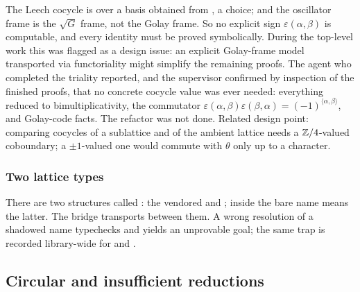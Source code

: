The Leech cocycle is  over a basis obtained from ,
a choice; and the oscillator frame is the $\sqrt G$ frame, not the Golay frame. So no explicit sign
$\varepsilon(\alpha,\beta)$ is computable, and every identity must be proved symbolically. During the
top-level work this was flagged as a design issue: an explicit Golay-frame model transported via
functoriality might simplify the remaining proofs. The agent who completed the triality reported,
and the supervisor confirmed by inspection of the finished proofs, that no concrete cocycle value
was ever needed: everything reduced to bimultiplicativity, the commutator
$\varepsilon(\alpha,\beta)\varepsilon(\beta,\alpha)=(-1)^{\langle\alpha,\beta\rangle}$, and Golay-code facts.
The refactor was not done. Related design point: comparing cocycles of a sublattice and of the
ambient lattice needs a ${\mathbb{Z}}/4$-valued coboundary; a $\pm1$-valued one would commute with $\theta$
only up to a character.

\subsubsection{Two lattice types}
There are two structures called : the vendored  and
; inside  the bare name means the latter. The bridge
 transports between them. A wrong resolution of a shadowed name
typechecks and yields an unprovable goal; the same trap is recorded library-wide for
 and .

\subsection{Circular and insufficient reductions}\label{ch15:sec:circ}

